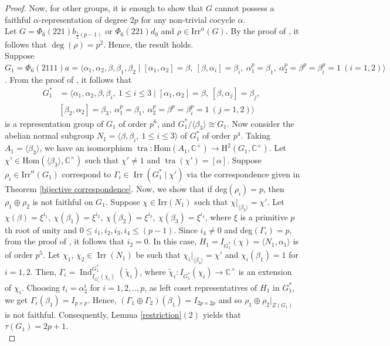 \documentclass[a4paper,11pt]{amsart}
\numberwithin{equation}{section}
\numberwithin{equation}{subsection}
\newcommand{\C}{\mathbb{C}}
\newcommand{\Hom}{\mathrm{Hom}}
\newcommand{\tra}{\operatorname{tra}}
\begin{document}
\begin{proof}
Now, for other groups, it is enough to show that $G$ cannot possess a faithful $\alpha$-representation of degree $2p$ for any non-trivial cocycle $\alpha$.
\\
Let $G= \Phi_{6}(221)b_{\tfrac{1}{2}(p-1)}$ or $\Phi_{6}(221)d_0$ and $\rho \in \mathrm{Irr}^\alpha(G)$. By the proof of \cite[Theorem 4.3, $(xvii)$]{sabnam}, it follows that $\operatorname{deg}(\rho)= p^2$. Hence, the result holds. \\
Suppose $G_1 = \Phi_{6}(2111)a= \langle \alpha_1, \alpha_2, \beta, \beta_1, \beta_2
\mid [\alpha_1,\alpha_2]= \beta,\ [\beta,\alpha_i]= \beta_i,\ \alpha_1^p= \beta_1,\ \alpha_2^p= \beta^p= \beta_i^p= 1\ (i=1,2) \rangle$. From the proof of \cite[Theorem 4.3, (xvi)]{sabnam}, it follows that
\begin{eqnarray*}
	{G}_1^* & = \langle \alpha_1, \alpha_2, \beta, \beta_i,\ 1 \le i \le 3 \mid [\alpha_1,\alpha_2]  =\beta,\ [\beta,\alpha_j]= \beta_j,\ \\
	& [\beta_2,\alpha_2]= \beta_3,\ \alpha_1^p= \beta_1,\ \alpha_2^p = \beta^p = \beta_i^p =1\ (j=1,2) \rangle    
\end{eqnarray*}
is a representation group of $G_1$ of order $p^6$, and ${G}_1^*/\langle \beta_3 \rangle \cong G_1$. 
Now consider the abelian normal subgroup
$N_1= \langle \beta, \beta_i,\ 1 \le i \le 3 \rangle$ of ${G}_1^*$ of order $p^4$. 
Taking $A_1=\langle \beta_3 \rangle$, we have an isomorphism $\tra: \Hom(A_1,\C^\times) \to \mathrm{H}^2(G_1, \C^\times)$. Let $\chi' \in \mathrm{Hom}(\langle \beta_3 \rangle, \C^\times)$   such that $\chi'\neq 1$ and $\tra(\chi')=[\alpha]$. Suppose $\rho_i \in \mathrm{Irr}^\alpha(G_1)$ correspond to $\Gamma_i \in \operatorname{Irr}({G}_1^* \mid \chi')$ via the correspondence given in Theorem \ref{bijective correspondence}. Now, we show that if deg$(\rho_i) =p$, then $\rho_1 \oplus \rho_2$ is not faithful on $G_1$.
Suppose $\chi \in \mathrm{Irr}(N_1)$ such that $\chi|_{\langle \beta_3 \rangle}= \chi'$.
Let $\chi(\beta)=\xi^{i_1},\ \chi(\beta_1)=\xi^{i_2},\ 
\chi(\beta_2)=\xi^{i_3},\ \chi(\beta_3)=\xi^{i_4}$,
where $\xi$ is a primitive $p$th root of unity and
$0 \le i_1,i_2,i_3,i_4 \le (p-1)$. 
Since $i_4 \ne 0$ and deg$(\Gamma_i)= p$, from the proof of \cite[Theorem 4.3, $(xvi)$]{sabnam}, it follows that $i_2= 0$. In this case, $H_1 = I_{{G}_1^*}(\chi)= \langle N_1,\alpha_1\rangle$ is of order $p^5$. Let $\chi_1$, $\chi_2 \in \operatorname{Irr}(N_1)$ be such that $\chi_i|_{\langle \beta_3 \rangle}= \chi'$ and $\chi_i(\beta_1)=1$ for $i=1,2$. Then, $\Gamma_i = \operatorname{Ind}^{G_1^*}_{I_{G_1^*}(\chi_i)}(\tilde{\chi}_i)$, where $\tilde{\chi}_i:I_{G_1^*}(\chi_i)\to \C^\times$ is an extension of $\chi_i$. Choosing $t_i= \alpha_2^i$ for $i=1,2,..,p$, as left coset representatives of $H_1$ in $G_1^*$, we get $\Gamma_i(\beta_1)= I_{p \times p}$. Hence, $(\Gamma_1 \oplus \Gamma_2)(\beta_1)= I_{2p \times 2p}$ and so $\rho_1 \oplus \rho_2|_{Z(G_1)}$ is not faithful. Consequently, Lemma \ref{restriction}$(2)$ yields that $\tau(G_1)= 2p+1$. \\

\end{proof}
\end{document}
